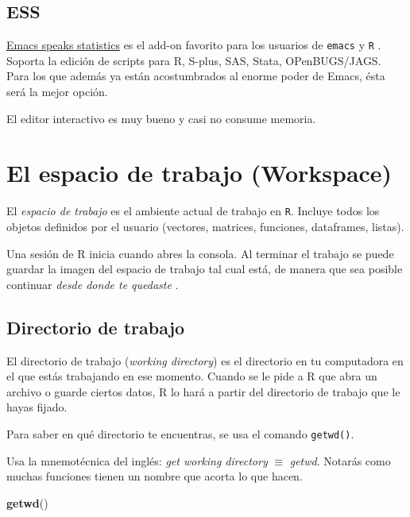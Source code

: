 \documentclass[]{article}
\newenvironment{Shaded}{\begin{snugshade}}{\end{snugshade}}
\newcommand{\KeywordTok}[1]{\textcolor[rgb]{0.13,0.29,0.53}{\textbf{#1}}}
\newcommand{\NormalTok}[1]{#1}
\begin{document}
\subsection{ESS}\label{ess}

\href{http://ess.r-project.org/}{Emacs speaks statistics} es el add-on
favorito para los usuarios de \texttt{emacs} y \texttt{R}
\parencite{rossini2004ess}. Soporta la edición de scripts para R,
S-plus, SAS, Stata, OPenBUGS/JAGS. Para los que además ya están
acostumbrados al enorme poder de Emacs, ésta será la mejor opción.

El editor interactivo es muy bueno y casi no consume memoria.

\section{El espacio de trabajo
(Workspace)}\label{el-espacio-de-trabajo-workspace}

El \emph{espacio de trabajo} es el ambiente actual de trabajo en
\texttt{R}. Incluye todos los objetos definidos por el usuario
(vectores, matrices, funciones, dataframes, listas).

Una sesión de R inicia cuando abres la consola. Al terminar el trabajo
se puede guardar la imagen del espacio de trabajo tal cual está, de
manera que sea posible continuar \emph{desde donde te quedaste}
\parencite[][p. 11]{kabacoff2015r}.

\subsection{Directorio de trabajo}\label{directorio-de-trabajo}

El directorio de trabajo (\emph{working directory}) es el directorio en
tu computadora en el que estás trabajando en ese momento. Cuando se le
pide a R que abra un archivo o guarde ciertos datos, R lo hará a partir
del directorio de trabajo que le hayas fijado.

Para saber en qué directorio te encuentras, se usa el comando
\texttt{getwd()}.

\begin{curiosidad} 
Usa la mnemotécnica del inglés: \textit{get working directory} $\equiv$ \textit{getwd}. 
Notarás como muchas funciones tienen un nombre que acorta lo que hacen.
\end{curiosidad}

\begin{Shaded}
\begin{Highlighting}[]
\KeywordTok{getwd}\NormalTok{()}
\end{Highlighting}
\end{Shaded}
\end{document}
